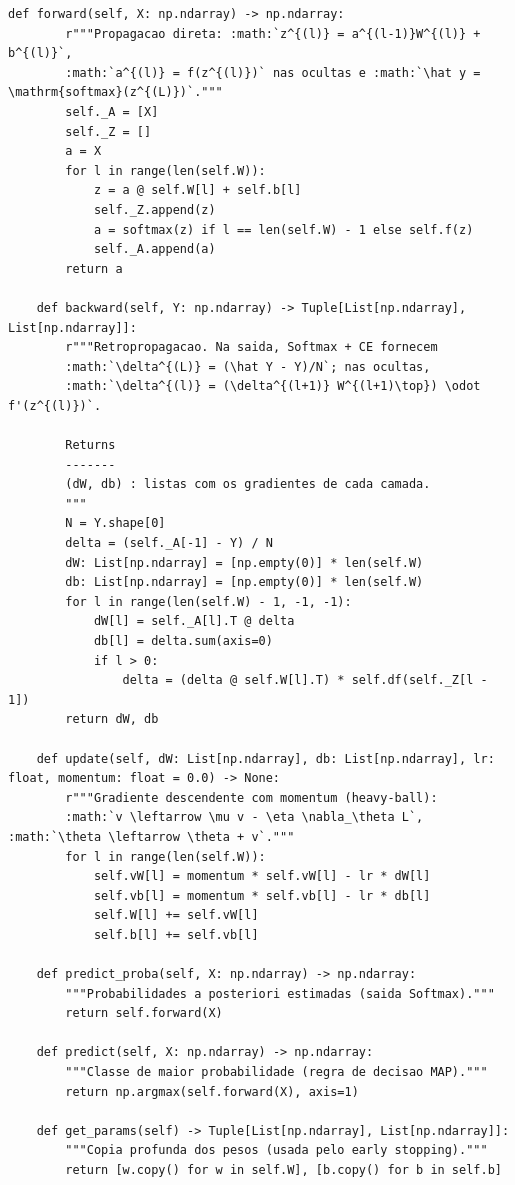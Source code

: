 \documentclass[12pt,a4paper]{article}
\begin{document}
{\begin{lstlisting}[caption={Programa completo \texttt{iris\_mlp.py}.},label={lst:iris_mlp}]
    def forward(self, X: np.ndarray) -> np.ndarray:
        r"""Propagacao direta: :math:`z^{(l)} = a^{(l-1)}W^{(l)} + b^{(l)}`,
        :math:`a^{(l)} = f(z^{(l)})` nas ocultas e :math:`\hat y = \mathrm{softmax}(z^{(L)})`."""
        self._A = [X]
        self._Z = []
        a = X
        for l in range(len(self.W)):
            z = a @ self.W[l] + self.b[l]
            self._Z.append(z)
            a = softmax(z) if l == len(self.W) - 1 else self.f(z)
            self._A.append(a)
        return a

    def backward(self, Y: np.ndarray) -> Tuple[List[np.ndarray], List[np.ndarray]]:
        r"""Retropropagacao. Na saida, Softmax + CE fornecem
        :math:`\delta^{(L)} = (\hat Y - Y)/N`; nas ocultas,
        :math:`\delta^{(l)} = (\delta^{(l+1)} W^{(l+1)\top}) \odot f'(z^{(l)})`.

        Returns
        -------
        (dW, db) : listas com os gradientes de cada camada.
        """
        N = Y.shape[0]
        delta = (self._A[-1] - Y) / N
        dW: List[np.ndarray] = [np.empty(0)] * len(self.W)
        db: List[np.ndarray] = [np.empty(0)] * len(self.W)
        for l in range(len(self.W) - 1, -1, -1):
            dW[l] = self._A[l].T @ delta
            db[l] = delta.sum(axis=0)
            if l > 0:
                delta = (delta @ self.W[l].T) * self.df(self._Z[l - 1])
        return dW, db

    def update(self, dW: List[np.ndarray], db: List[np.ndarray], lr: float, momentum: float = 0.0) -> None:
        r"""Gradiente descendente com momentum (heavy-ball):
        :math:`v \leftarrow \mu v - \eta \nabla_\theta L`, :math:`\theta \leftarrow \theta + v`."""
        for l in range(len(self.W)):
            self.vW[l] = momentum * self.vW[l] - lr * dW[l]
            self.vb[l] = momentum * self.vb[l] - lr * db[l]
            self.W[l] += self.vW[l]
            self.b[l] += self.vb[l]

    def predict_proba(self, X: np.ndarray) -> np.ndarray:
        """Probabilidades a posteriori estimadas (saida Softmax)."""
        return self.forward(X)

    def predict(self, X: np.ndarray) -> np.ndarray:
        """Classe de maior probabilidade (regra de decisao MAP)."""
        return np.argmax(self.forward(X), axis=1)

    def get_params(self) -> Tuple[List[np.ndarray], List[np.ndarray]]:
        """Copia profunda dos pesos (usada pelo early stopping)."""
        return [w.copy() for w in self.W], [b.copy() for b in self.b]


\end{lstlisting}}
\end{document}
